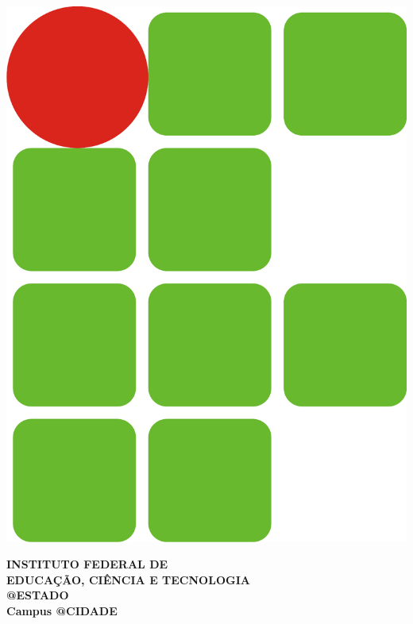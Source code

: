 \documentclass[a4paper, 12pt]{letter}
\begin{document}
\hspace{1.4cm}
\begin{minipage}{.19\textwidth}
    \includegraphics[width=.99\textwidth]{res/images/logo}
\end{minipage}
\begin{minipage}[t]{\textwidth}
        \vspace{.001cm}
        {\bf
            {\selectfont
                INSTITUTO FEDERAL DE\\
                EDUCAÇÃO, CIÊNCIA E TECNOLOGIA\\
                {\color{green}
                    \uppercase{@ESTADO}\\
                    Campus @CIDADE
                }
            }
        }
\end{minipage}
\end{document}
